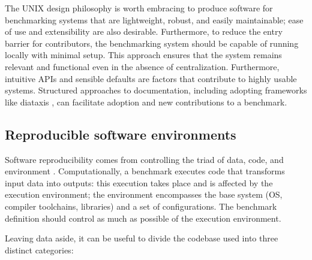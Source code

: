 \documentclass[11pt]{article}
\begin{document}
The UNIX design philosophy \cite{Pike1984-we} is worth embracing to produce software for benchmarking systems that are lightweight, robust, and easily maintainable; ease of use and extensibility are also desirable. Furthermore, to reduce the entry barrier for contributors, the benchmarking system should be capable of running locally with minimal setup. This approach ensures that the system remains relevant and functional even in the absence of centralization. Furthermore, intuitive APIs and sensible defaults \cite{Proctor2018-do} are factors that contribute to highly usable systems. Structured approaches to documentation, including adopting frameworks like diataxis \cite{ProcidaUnknown-vf}, can facilitate adoption and new contributions to a benchmark.

\subsection*{Reproducible software environments}

Software reproducibility comes from controlling the triad of data, code, and environment \cite{Hill2024-gf}. Computationally, a benchmark executes code that transforms input data into outputs: this execution takes place and is affected by the execution environment; the environment encompasses the base system (OS, compiler toolchains, libraries) and a set of configurations. The benchmark definition should control as much as possible of the execution environment.

Leaving data aside, it can be useful to divide the codebase used into three distinct categories:
\end{document}
